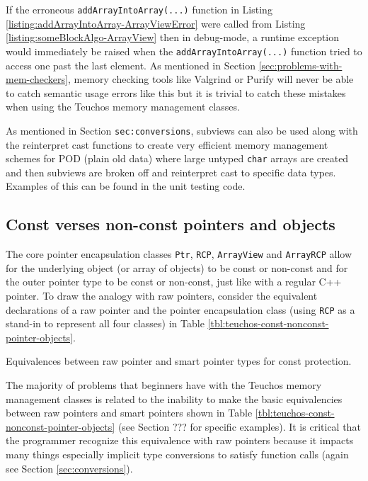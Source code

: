 \documentclass[pdf,ps2pdf,11pt]{SANDreport}
\begin{document}
If the erroneous {}\texttt{addArrayIntoArray(...)} function in Listing
{}\ref{listing:addArrayIntoArray-ArrayViewError} were called from
Listing {}\ref{listing:someBlockAlgo-ArrayView} then in debug-mode, a
runtime exception would immediately be raised when the
{}\texttt{addArrayIntoArray(...)} function tried to access one past
the last element.  As mentioned in Section
{}\ref{sec:problems-with-mem-checkers}, memory checking tools like
Valgrind or Purify will never be able to catch semantic usage errors
like this but it is trivial to catch these mistakes when using the
Teuchos memory management classes.

As mentioned in Section {}\texttt{sec:conversions}, subviews can also
be used along with the reinterpret cast functions to create very
efficient memory management schemes for POD (plain old data) where
large untyped {}\texttt{char} arrays are created and then subviews are
broken off and reinterpret cast to specific data types.  Examples of
this can be found in the unit testing code.


%
{}\subsection{Const verses non-const pointers and objects}
\label{sec:teuchos-const-nonconst-pointer-objects}
%

The core pointer encapsulation classes {}\texttt{Ptr},
{}\texttt{RCP}, {}\texttt{ArrayView} and {}\texttt{ArrayRCP} allow for
the underlying object (or array of objects) to be const or non-const
and for the outer pointer type to be const or non-const, just like
with a regular C++ pointer.  To draw the analogy with raw pointers,
consider the equivalent declarations of a raw pointer and the pointer
encapsulation class (using {}\texttt{RCP} as a stand-in to represent
all four classes) in Table
{}\ref{tbl:teuchos-const-nonconst-pointer-objects}.

\begin{table}
%
\begin{center}
%
%

%
%
\end{center}
\caption{\label{tbl:teuchos-const-nonconst-pointer-objects}
Equivalences between raw pointer and smart pointer types for const
protection.}
%
\end{table}

The majority of problems that beginners have with the Teuchos memory
management classes is related to the inability to make the basic
equivalencies between raw pointers and smart pointers shown in Table
{}\ref{tbl:teuchos-const-nonconst-pointer-objects} (see Section ??? 
for specific examples).  It is critical that the programmer recognize
this equivalence with raw pointers because it impacts many things
especially implicit type conversions to satisfy function calls (again
see Section {}\ref{sec:conversions}).
\end{document}
